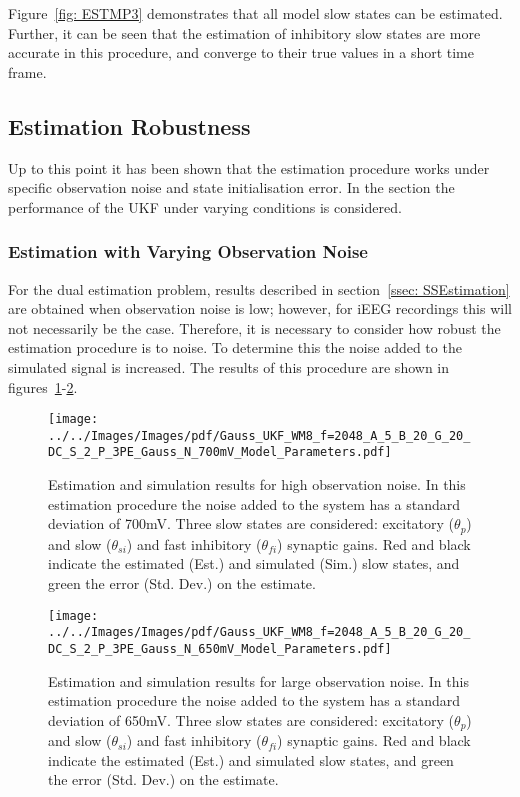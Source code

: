 Figure~\ref{fig: ESTMP3} demonstrates that all model slow states can be estimated. Further, it can be seen that the estimation of inhibitory slow states are more accurate in this procedure, and converge to their true values in a short time frame.

\subsection{Estimation Robustness}
\label{ssec: ESTT}

Up to this point it has been shown that the estimation procedure works under specific observation noise and state initialisation error. In the section the performance of the UKF under varying conditions is considered.

\subsubsection{Estimation with Varying Observation Noise}


For the dual estimation problem, results described in section~\ref{ssec: SSEstimation} are obtained when observation noise is low; however, for iEEG recordings this will not necessarily be the case. Therefore, it is necessary to consider how robust the estimation procedure is to noise. To determine this the noise added to the simulated signal is increased. The results of this procedure are shown in figures~\ref{fig: ESTFail}-\ref{fig: ESTPass}.
\begin{figure}%
	\centering
		\texttt{[image: ../../Images/Images/pdf/Gauss\_UKF\_WM8\_f=2048\_A\_5\_B\_20\_G\_20\_DC\_S\_2\_P\_3PE\_Gauss\_N\_700mV\_Model\_Parameters.pdf]}
	\caption{Estimation and simulation results for high observation noise. In this estimation procedure the noise added to the system has a standard deviation of 700mV. Three slow states are considered: excitatory ($\theta_{p}$) and slow ($\theta_{si}$) and fast inhibitory ($\theta_{fi}$) synaptic gains. Red and black indicate the estimated (Est.) and simulated (Sim.) slow states, and green the error (Std. Dev.) on the estimate.}
	\label{fig: ESTFail}
\end{figure}
\begin{figure}
	\centering
		\texttt{[image: ../../Images/Images/pdf/Gauss\_UKF\_WM8\_f=2048\_A\_5\_B\_20\_G\_20\_DC\_S\_2\_P\_3PE\_Gauss\_N\_650mV\_Model\_Parameters.pdf]}
	\caption{Estimation and simulation results for large observation noise. In this estimation procedure the noise added to the system has a standard deviation of 650mV. Three slow states are considered: excitatory ($\theta_{p}$) and slow ($\theta_{si}$) and fast inhibitory ($\theta_{fi}$) synaptic gains. Red and black indicate the estimated (Est.) and simulated slow states, and green the error (Std. Dev.) on the estimate.}
	\label{fig: ESTPass}
\end{figure}%

